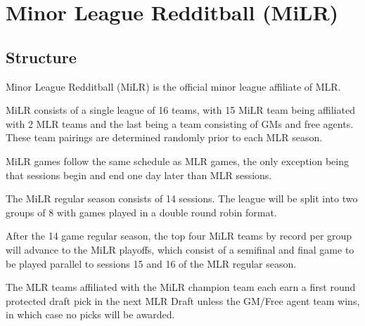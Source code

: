 
\section{Minor League Redditball (MiLR)}

\subsection{Structure}
\begin{deepEnumerate}
	\item Minor League Redditball (MiLR) is the official minor league affiliate of MLR.
	\item MiLR consists of a single league of 16 teams, 
	with 15 MiLR team being affiliated with 2 MLR teams and the last being a team consisting of GMs and free agents. 
	These team pairings are determined randomly prior to each MLR season.
	\item MiLR games follow the same schedule as MLR games, 
	the only exception being that sessions begin and end one day later than MLR sessions.
	\item The MiLR regular season consists of 14 sessions. 
	The league will be split into two groups of 8 with games played in a double round robin format.
	\item After the 14 game regular season, the top four MiLR teams by record per group will advance to the MiLR playoffs, 
	which consist of a semifinal and final game to be played parallel to sessions 15 and 16 of the MLR regular season.
	\item The MLR teams affiliated with the MiLR champion team each earn a first round protected draft pick in the next MLR Draft 
	unless the GM/Free agent team wins, in which case no picks will be awarded.
\end{deepEnumerate}

